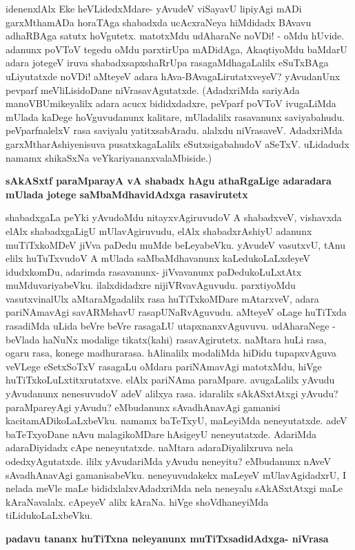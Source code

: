 idenenxlAlx Eke heVLidedxMdare- yAvudeV viSayavU lipiyAgi mADi garxMthamADa horaTAga shabadxda ucAcxraNeya hiMdidadx BAvavu adhaRBAga satutx hoVgutetx. matotxMdu udAharaNe noVDi! - oMdu hUvide. adanunx poVToV tegedu oMdu parxtirUpa mADidAga, AkaqtiyoMdu baMdarU adara jotegeV iruva shabadxsapxshaRrUpa rasagaMdhagaLalilx eSuTxBAga uLiyutatxde noVDi! aMteyeV adara hAva-BAvagaLirutatxveyeV? yAvudanUnx pevparf meVliLisidoDane niVrasavAgutatxde. (AdadxriMda sariyAda manoVBUmikeyalilx adara acucx bididxdadxre, peVparf poVToV ivugaLiMda mUlada kaDege hoVguvudanunx kalitare, mUladalilx rasavanunx saviyabahudu. peVparfnalelxV rasa saviyalu yatitxsabAradu. alalxdu niVrasaveV. AdadxriMda garxMtharAshiyenisuva pusatxkagaLalilx eSutxsigabahudoV aSeTxV. uLidadudx namamx shikaSxNa veYkariyananxvalaMbiside.)

{\bf sAkASxtf paraMparayA vA shabadx hAgu athaRgaLige adaradara mUlada jotege saMbaMdhavidAdxga rasavirutetx}

shabadxgaLa peYki yAvudoMdu nitayxvAgiruvudoV A shabadxveV, vishavxda elAlx shabadxgaLigU mUlavAgiruvudu, elAlx shabadxrAshiyU adanunx muTiTxkoMDeV jiVva paDedu muMde beLeyabeVku. yAvudeV vasutxvU, tAnu elilx huTuTxvudoV A mUlada saMbaMdhavanunx kaLedukoLaLxdeyeV idudxkomDu, adarimda rasavanunx- jiVvavanunx paDedukoLuLxtAtx muMduvariyabeVku. ilalxdidadxre nijiVRvavAguvudu. parxtiyoMdu vasutxvinalUlx aMtaraMgadalilx rasa huTiTxkoMDare mAtarxveV, adara pariNAmavAgi savARMshavU rasapUNaRvAguvudu. aMteyeV oLage huTiTxda rasadiMda uLida beVre beVre rasagaLU utapxnanxvAguvuvu. udAharaNege - beVlada haNuNx modalige tikatx(kahi) rasavAgirutetx. naMtara huLi rasa, ogaru rasa, konege madhurarasa. hAlinalilx modaliMda hiDidu tupapxvAguva veVLege eSetxSoTxV rasagaLu oMdara pariNAmavAgi matotxMdu, hiVge huTiTxkoLuLxtitxrutatxve. elAlx pariNAma paraMpare. avugaLalilx yAvudu yAvudanunx nenesuvudoV adeV alilxya rasa. idaralilx sAkASxtAtxgi yAvudu? paraMpareyAgi yAvudu? eMbudanunx sAvadhAnavAgi gamanisi kacitamADikoLaLxbeVku. namamx baTeTxyU, maLeyiMda neneyutatxde. adeV baTeTxyoDane nAvu malagikoMDare hAsigeyU neneyutatxde. AdariMda adaraDiyidadx cApe neneyutatxde. naMtara adaraDiyalilxruva nela odedxyAgutatxde. ililx yAvudariMda yAvudu neneyitu? eMbudanunx nAveV sAvadhAnavAgi gamanisabeVku. neneyuvudakekx maLeyeV mUlavAgidadxrU, I nelada meVle maLe bididxlalxvAdadxriMda nela neneyalu sAkASxtAtxgi maLe kAraNavalalx. cApeyeV alilx kAraNa. hiVge shoVdhaneyiMda tiLidukoLaLxbeVku.

{\bf padavu tananx huTiTxna neleyanunx muTiTxsadidAdxga- niVrasa}

